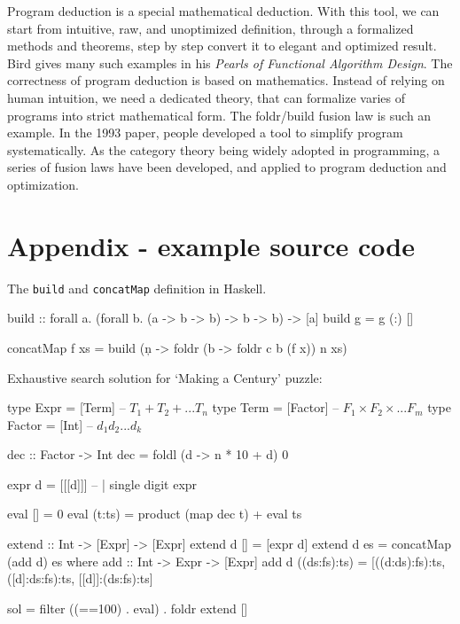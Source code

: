 \documentclass[b5paper]{article}
\begin{document}
Program deduction is a special mathematical deduction. With this tool, we can start from intuitive, raw, and unoptimized definition, through a formalized methods and theorems, step by step convert it to elegant and optimized result. Bird gives many such examples in his {\em Pearls of Functional Algorithm Design}\cite{Bird-2010}. The correctness of program deduction is based on mathematics. Instead of relying on human intuition, we need a dedicated theory, that can formalize varies of programs into strict mathematical form. The foldr/build fusion law is such an example. In the 1993 paper\cite{GLPJ-1993}, people developed a tool to simplify program systematically. As the category theory being widely adopted in programming, a series of fusion laws have been developed\cite{Hinze-Harper-James-2010}, and applied to program deduction and optimization.

\section{Appendix - example source code}

The \texttt{build} and \texttt{concatMap} definition in Haskell.

\begin{Haskell}
build :: forall a. (forall b. (a -> b -> b) -> b -> b) -> [a]
build g = g (:) []

concatMap f xs = build (\c n -> foldr (\x b -> foldr c b (f x)) n xs)
\end{Haskell}

Exhaustive search solution for `Making a Century' puzzle:

\begin{Haskell}[mathescape = true]
type Expr = [Term]     -- $T_1 + T_2 + ... T_n$
type Term = [Factor]   -- $F_1 \times F_2 \times ... F_m$
type Factor = [Int]    -- $d_1 d_2 ...d_k$

dec :: Factor -> Int
dec = foldl (\n d -> n * 10 + d) 0

expr d = [[[d]]]  -- | single digit expr

eval [] = 0
eval (t:ts) = product (map dec t) + eval ts

extend :: Int -> [Expr] -> [Expr]
extend d [] = [expr d]
extend d es = concatMap (add d) es where
  add :: Int -> Expr -> [Expr]
  add d ((ds:fs):ts) = [((d:ds):fs):ts,
                        ([d]:ds:fs):ts,
                        [[d]]:(ds:fs):ts]

sol = filter ((==100) . eval) . foldr extend []
\end{Haskell}
\end{document}
